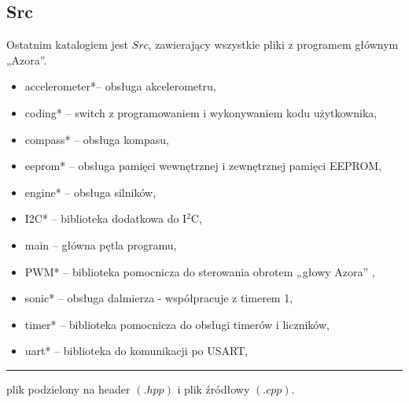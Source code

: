     \subsection{Src}
        \tab Ostatnim katalogiem jest $Src$, zawierający wszystkie pliki z programem głównym „Azora”. 
        \begin{itemize}
            \item accelerometer*-- obsługa akcelerometru,
            \item coding*       -- switch z programowaniem i wykonywaniem kodu użytkownika,
            \item compass*      -- obsługa kompasu,
            \item eeprom*       -- obsługa pamięci wewnętrznej i zewnętrznej pamięci EEPROM,
            \item engine*       -- obsługa silników,
            \item I2C*          -- biblioteka dodatkowa do I$^2$C,
            \item main          -- główna pętla programu,
            \item PWM*          -- biblioteka pomocnicza do sterowania obrotem „głowy Azora” ,
            \item sonic*        -- obsługa dalmierza - współpracuje z timerem 1,
            \item timer*        -- biblioteka pomocnicza do obsługi timerów i liczników,
            \item uart*         -- biblioteka do komunikacji po USART,
        \end{itemize}
        \vspace{4pt}
        \hrule
        \vspace{16pt}
        \tab * plik podzielony na header $(.hpp)$ i plik źródłowy $(.cpp)$.

    

        